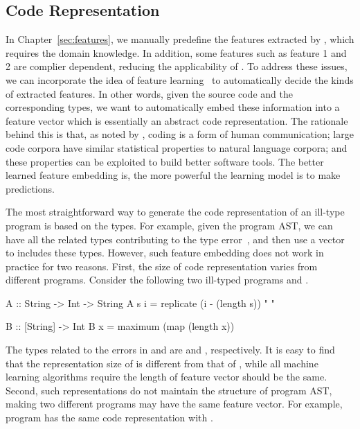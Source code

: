 \documentclass[12pt]{report}	%
\begin{document}
\subsection{Code Representation}
\label{sec:other2}

In Chapter~\ref{sec:features}, we manually predefine the features extracted by \newCompiler,
which requires the domain knowledge.
In addition, some features such as feature 1 and 2 are complier dependent,
reducing the applicability of \newCompiler.
%
To address these issues,
we can incorporate the idea of feature learning~\cite{bengio2013representation,Chae:2017:AGF:3152284.3133925}
to automatically decide the kinds of extracted features.
%
In other words, given the source code and the corresponding types,
we want to automatically embed these information into a feature vector which is essentially an abstract code representation.
%
The rationale behind this is that, as noted by \cite{allamanis2018survey},
coding is a form of human communication;
large code corpora have similar statistical properties to natural language corpora;
and these properties can be exploited to build better software tools.
%
The better learned feature embedding is, the more powerful the learning model is to make predictions.


The most straightforward way to generate the code representation of an ill-type program is based on the types.
For example, given the program AST, we can have all the related types contributing to the type error~\cite{Zhang15:DTE},
and then use a vector to includes these types.
%
However, such feature embedding does not work in practice for two reasons.
First, the size of code representation varies from different programs.
Consider the following two ill-typed programs  and .
%
\begin{program}
A :: String -> Int -> String
A s i = replicate (i - (length s)) " "
\end{program}
%
\begin{program}
B :: [String] -> Int
B x = maximum (map (length x))
\end{program}
%
The types related to the errors in  and  are
and , respectively.
%
It is easy to find that the representation size of  is different from that of ,
while all machine learning algorithms require the length of feature vector should be the same.
%
Second, such representations do not maintain the structure of program AST,
making two different programs may have the same feature vector.
For example, program  has the same code representation with .
\end{document}
